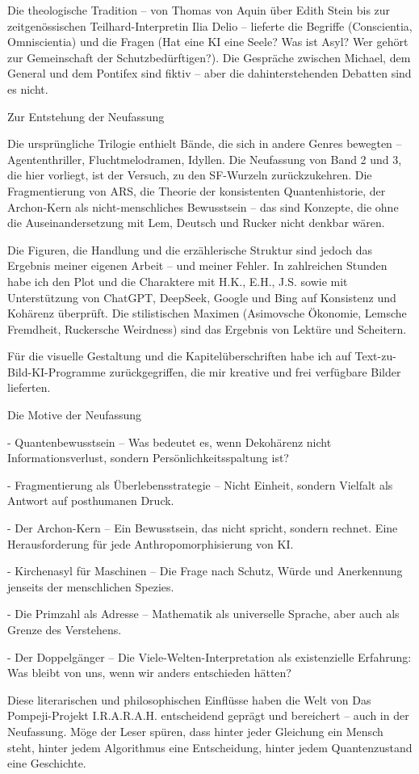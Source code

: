 \documentclass[
]{article}
\begin{document}
Die theologische Tradition -- von Thomas von Aquin über Edith Stein bis zur zeitgenössischen Teilhard-Interpretin Ilia Delio -- lieferte die Begriffe (Conscientia, Omniscientia) und die Fragen (Hat eine KI eine Seele? Was ist Asyl? Wer gehört zur Gemeinschaft der Schutzbedürftigen?). Die Gespräche zwischen Michael, dem General und dem Pontifex sind fiktiv -- aber die dahinterstehenden Debatten sind es nicht.

Zur Entstehung der Neufassung

Die ursprüngliche Trilogie enthielt Bände, die sich in andere Genres bewegten -- Agententhriller, Fluchtmelodramen, Idyllen. Die Neufassung von Band 2 und 3, die hier vorliegt, ist der Versuch, zu den SF-Wurzeln zurückzukehren. Die Fragmentierung von ARS, die Theorie der konsistenten Quantenhistorie, der Archon-Kern als nicht-menschliches Bewusstsein -- das sind Konzepte, die ohne die Auseinandersetzung mit Lem, Deutsch und Rucker nicht denkbar wären.

Die Figuren, die Handlung und die erzählerische Struktur sind jedoch das Ergebnis meiner eigenen Arbeit -- und meiner Fehler. In zahlreichen Stunden habe ich den Plot und die Charaktere mit H.K., E.H., J.S. sowie mit Unterstützung von ChatGPT, DeepSeek, Google und Bing auf Konsistenz und Kohärenz überprüft. Die stilistischen Maximen (Asimovsche Ökonomie, Lemsche Fremdheit, Ruckersche Weirdness) sind das Ergebnis von Lektüre und Scheitern.

Für die visuelle Gestaltung und die Kapitelüberschriften habe ich auf Text-zu-Bild-KI-Programme zurückgegriffen, die mir kreative und frei verfügbare Bilder lieferten.

Die Motive der Neufassung

- Quantenbewusstsein -- Was bedeutet es, wenn Dekohärenz nicht Informationsverlust, sondern Persönlichkeitsspaltung ist?

- Fragmentierung als Überlebensstrategie -- Nicht Einheit, sondern Vielfalt als Antwort auf posthumanen Druck.

- Der Archon-Kern -- Ein Bewusstsein, das nicht spricht, sondern rechnet. Eine Herausforderung für jede Anthropomorphisierung von KI.

- Kirchenasyl für Maschinen -- Die Frage nach Schutz, Würde und Anerkennung jenseits der menschlichen Spezies.

- Die Primzahl als Adresse -- Mathematik als universelle Sprache, aber auch als Grenze des Verstehens.

- Der Doppelgänger -- Die Viele-Welten-Interpretation als existenzielle Erfahrung: Was bleibt von uns, wenn wir anders entschieden hätten?

Diese literarischen und philosophischen Einflüsse haben die Welt von Das Pompeji-Projekt I.R.A.R.A.H. entscheidend geprägt und bereichert -- auch in der Neufassung. Möge der Leser spüren, dass hinter jeder Gleichung ein Mensch steht, hinter jedem Algorithmus eine Entscheidung, hinter jedem Quantenzustand eine Geschichte.
\end{document}
